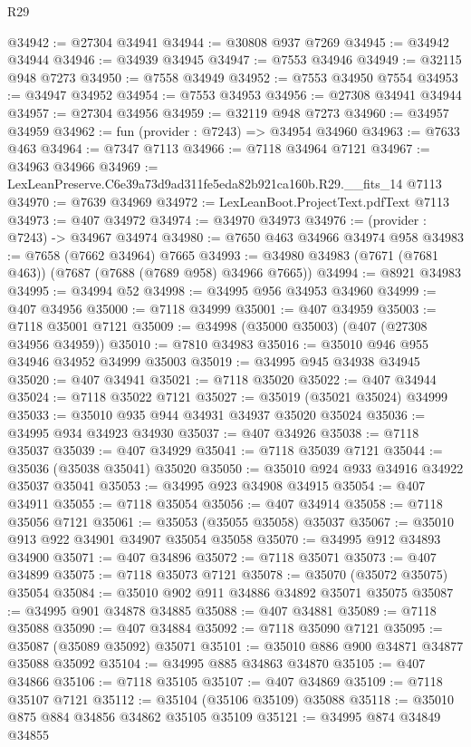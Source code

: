 \begin{lexlean}{R29}
\begin{coremodule}
@34942 := @27304 @34941
@34944 := @30808 @937 @7269
@34945 := @34942 @34944
@34946 := @34939 @34945
@34947 := @7553 @34946
@34949 := @32115 @948 @7273
@34950 := @7558 @34949
@34952 := @7553 @34950 @7554
@34953 := @34947 @34952
@34954 := @7553 @34953
@34956 := @27308 @34941 @34944
@34957 := @27304 @34956
@34959 := @32119 @948 @7273
@34960 := @34957 @34959
@34962 := fun (provider : @7243) => @34954 @34960
@34963 := @7633 @463
@34964 := @7347 @7113
@34966 := @7118 @34964 @7121
@34967 := @34963 @34966
@34969 := LexLeanPreserve.C6e39a73d9ad311fe5eda82b921ca160b.R29.__fits_14 @7113
@34970 := @7639 @34969
@34972 := LexLeanBoot.ProjectText.pdfText @7113
@34973 := @407 @34972
@34974 := @34970 @34973
@34976 := (provider : @7243) -> @34967 @34974
@34980 := @7650 @463 @34966 @34974 @958
@34983 := @7658 (@7662 @34964) @7665
@34993 := @34980 @34983 (@7671 (@7681 @463)) (@7687 (@7688 (@7689 @958) @34966 @7665))
@34994 := @8921 @34983
@34995 := @34994 @52
@34998 := @34995 @956 @34953 @34960
@34999 := @407 @34956
@35000 := @7118 @34999
@35001 := @407 @34959
@35003 := @7118 @35001 @7121
@35009 := @34998 (@35000 @35003) (@407 (@27308 @34956 @34959))
@35010 := @7810 @34983
@35016 := @35010 @946 @955 @34946 @34952 @34999 @35003
@35019 := @34995 @945 @34938 @34945
@35020 := @407 @34941
@35021 := @7118 @35020
@35022 := @407 @34944
@35024 := @7118 @35022 @7121
@35027 := @35019 (@35021 @35024) @34999
@35033 := @35010 @935 @944 @34931 @34937 @35020 @35024
@35036 := @34995 @934 @34923 @34930
@35037 := @407 @34926
@35038 := @7118 @35037
@35039 := @407 @34929
@35041 := @7118 @35039 @7121
@35044 := @35036 (@35038 @35041) @35020
@35050 := @35010 @924 @933 @34916 @34922 @35037 @35041
@35053 := @34995 @923 @34908 @34915
@35054 := @407 @34911
@35055 := @7118 @35054
@35056 := @407 @34914
@35058 := @7118 @35056 @7121
@35061 := @35053 (@35055 @35058) @35037
@35067 := @35010 @913 @922 @34901 @34907 @35054 @35058
@35070 := @34995 @912 @34893 @34900
@35071 := @407 @34896
@35072 := @7118 @35071
@35073 := @407 @34899
@35075 := @7118 @35073 @7121
@35078 := @35070 (@35072 @35075) @35054
@35084 := @35010 @902 @911 @34886 @34892 @35071 @35075
@35087 := @34995 @901 @34878 @34885
@35088 := @407 @34881
@35089 := @7118 @35088
@35090 := @407 @34884
@35092 := @7118 @35090 @7121
@35095 := @35087 (@35089 @35092) @35071
@35101 := @35010 @886 @900 @34871 @34877 @35088 @35092
@35104 := @34995 @885 @34863 @34870
@35105 := @407 @34866
@35106 := @7118 @35105
@35107 := @407 @34869
@35109 := @7118 @35107 @7121
@35112 := @35104 (@35106 @35109) @35088
@35118 := @35010 @875 @884 @34856 @34862 @35105 @35109
@35121 := @34995 @874 @34849 @34855

\end{coremodule}
\end{lexlean}
